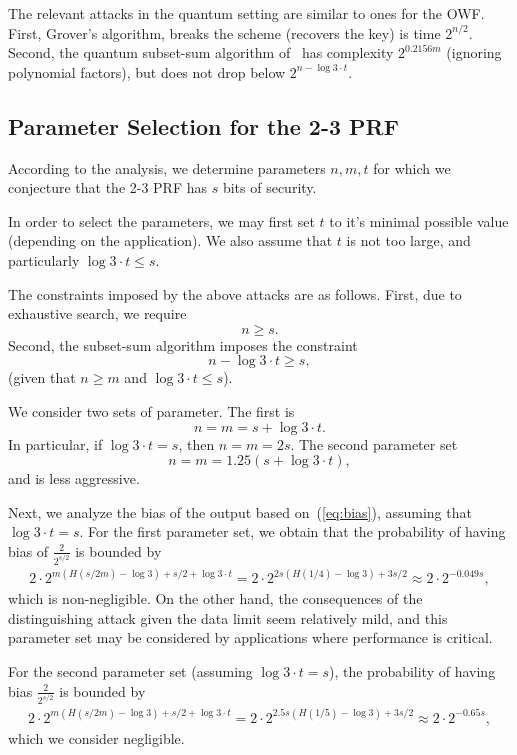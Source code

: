\documentclass[orivec,envcountsect]{llncs}
\begin{document}
The relevant attacks in the quantum setting are similar to ones for the OWF.
First, Grover's algorithm, breaks the scheme (recovers the key) is time $2^{n/2}$.
Second, the quantum subset-sum algorithm of~\cite{BonnetainBSS20} has complexity $2^{0.2156 m}$ (ignoring polynomial factors), but does not drop below $2^{n - \log 3 \cdot t}$.


\subsection{Parameter Selection for the 2-3 PRF}


According to the analysis, we determine parameters $n,m,t$ for which
we conjecture that the 2-3 PRF has $s$ bits of security.

In order to select the parameters, we may first set $t$ to it's minimal possible value
(depending on the application).
We also assume that $t$ is not too large, and particularly $\log 3 \cdot t \leq s$.

The constraints imposed by the above attacks are as follows.
First, due to exhaustive search, we require $$n \geq s.$$
Second, the subset-sum algorithm
imposes the constraint
$$n - \log 3 \cdot t \geq s,$$
(given that $n \geq m$ and $\log 3 \cdot t \leq s$).


We consider two sets of parameter.
The first is
$$n = m = s + \log 3 \cdot t.$$
In particular, if $\log 3 \cdot t  = s$, then
$n = m = 2s$.
The second parameter set
$$n = m = 1.25(s + \log 3 \cdot t),$$
and is less aggressive.

Next, we analyze the bias of the output based on~(\ref{eq:bias}),
assuming that $\log 3 \cdot t = s$.
For the first parameter set,
we obtain that the probability of having bias of $\tfrac{2}{2^{s/2}}$ is bounded by
\begin{align*}
2 \cdot 2^{m (H(s/2m) - \log 3) + s/2 + \log 3 \cdot t} =
2 \cdot 2^{2s (H(1/4) - \log 3) + 3s/2} \approx
2 \cdot 2^{-0.049s},
\end{align*}
which is non-negligible.
On the other hand, the consequences of the distinguishing attack given the data limit
seem relatively mild, and this parameter set may be considered by applications
where performance is critical.

For the second parameter set (assuming $\log 3 \cdot t = s$),
the probability of having bias $\tfrac{2}{2^{s/2}}$ is bounded by
\begin{align*}
2 \cdot 2^{m (H(s/2m) - \log 3) + s/2 + \log 3 \cdot t} =
2 \cdot 2^{2.5s (H(1/5) - \log 3) + 3s/2} \approx
2 \cdot 2^{-0.65s},
\end{align*}
which we consider negligible.
\end{document}
